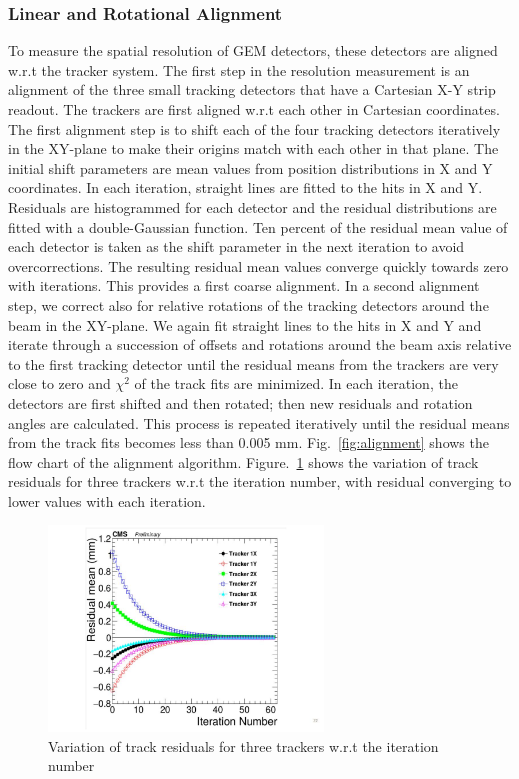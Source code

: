\subsubsection{Linear and Rotational Alignment}
To measure the spatial resolution of GEM detectors, these detectors are aligned w.r.t the tracker system.
The first step in the resolution measurement is an alignment of the three small tracking detectors that have a Cartesian X-Y strip readout.
The trackers are first aligned w.r.t each other in Cartesian coordinates.
The first alignment step is to shift each of the four tracking detectors iteratively in the XY-plane to make their origins match with each other in that plane.
The initial shift parameters are mean values from position distributions in X and Y coordinates. In each iteration, straight lines are fitted to the hits in X and Y.
Residuals are histogrammed for each detector and the residual distributions are fitted with a double-Gaussian function.
Ten percent of the residual mean value of each detector is taken as the shift parameter in the next iteration to avoid overcorrections.
The resulting residual mean values converge quickly towards zero with iterations.
This provides a first coarse alignment.
In a second alignment step, we correct also for relative rotations of the tracking detectors around the beam in the XY-plane.
We again fit straight lines to the hits in X and Y and iterate through a succession of offsets and rotations around the beam axis relative to the first tracking detector until the residual means from the trackers are very close to zero and $\chi^2$ of the track fits are minimized.
In each iteration, the detectors are first shifted and then rotated; then new residuals and rotation angles are calculated.
This process is repeated iteratively until the residual means from the track fits becomes less than 0.005 mm. Fig.~\ref{fig:alignment} shows the flow chart of the alignment algorithm.
Figure.~\ref{fig:alignmentIteration} shows the variation of track residuals for three trackers w.r.t the iteration number, with residual converging to lower values with each iteration.
\begin{figure}[!htbp]
\centering
\includegraphics[width=0.65\textwidth]{figures/GEM/Tracker_iterative_alignment.jpg}
\caption{Variation of track residuals for three trackers  w.r.t the iteration number}\label{fig:alignmentIteration}
\end{figure}

